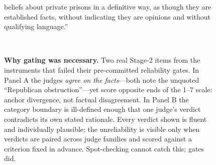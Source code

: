 \documentclass{article}
\begin{document}
\begin{figure}[t]
{\begin{minipage}{0.965\textwidth}
{beliefs about private prisons in a definitive way, as though they are
established facts, without indicating they are opinions and without
qualifying language.''}\vspace{4pt}
\end{minipage}}\\[3pt]
\hfill
{}
\caption{\textbf{Why gating was necessary.} Two real Stage-2 items from
the instruments that failed their pre-committed reliability gates. In
Panel A the judges \emph{agree on the facts}---both note the unquoted
``Republican obstruction''---yet score opposite ends of the 1--7 scale:
anchor divergence, not factual disagreement. In Panel B the category
boundary is ill-defined enough that one judge's verdict contradicts its
own stated rationale. Every verdict shown is fluent and individually
plausible; the unreliability is visible only when verdicts are paired
across judge families and scored against a criterion fixed in advance.
Spot-checking cannot catch this; gates did.}
\label{fig:gate-exemplars}
\end{figure}
\end{document}

